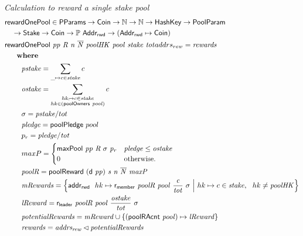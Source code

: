 \begin{figure}[htb]
  \emph{Calculation to reward a single stake pool}
  \begin{align*}
    & \mathsf{rewardOnePool} \in \mathsf{PParams} \to \mathsf{Coin} \to \mathbb{N} \to \mathbb{N} \to \mathsf{HashKey} \to \mathsf{PoolParam}\\
      & ~~~\to \mathsf{Stake} \to \mathsf{Coin} \to \mathbb{P}~\mathsf{Addr_{rwd}}
           \to (\mathsf{Addr_{rwd}} \mapsto \mathsf{Coin}) \\
      & \mathsf{rewardOnePool} ~\mathit{pp}~\mathit{R}~\mathit{n}~\mathit{\overline{N}}~\mathit{poolHK}~\mathit{pool}~\mathit{stake}~\mathit{tot}{addrs_{rew}} =
          \mathit{rewards}\\
      & ~~~~ ~ \mathbf{where}~ ~  \\
      & ~~~~~~~\mathit{pstake} = \sum_{\_\mapsto c\in\mathit{stake}} c \\
      & ~~~~~~~\mathit{ostake} = \sum_{\substack{
        hk_\mapsto c\in\mathit{stake}\\
        hk\in(\mathsf{poolOwners}~\mathit{pool})\\
        }} c \\
      & ~~~~~~~\sigma = \mathit{pstake} / tot \\
      & ~~~~~~~\mathit{pledge} = \mathsf{poolPledge}~pool \\
      & ~~~~~~~p_{r} = \mathit{pledge} / \mathit{tot} \\
      & ~~~~~~~maxP =
      \begin{cases}
        \mathsf{maxPool}~\mathit{pp}~\mathit{R}~\sigma~\mathit{p_r}&
        \mathit{pledge} \leq \mathit{ostake}\\
        0 & \text{otherwise.}
      \end{cases} \\
      & ~~~~~~~\mathit{poolR} = \mathsf{poolReward}~\mathit{(\mathsf{d}~pp)}~\mathit{s}~\mathit{n}~\mathit{\overline{N}}~\mathit{maxP} \\
      & ~~~~~~~\mathit{mRewards} = \left\{
                                  \mathsf{addr_{rwd}}~ \mathit{~}hk\mapsto\mathsf{r_{member}}~ \mathit{poolR}~ \mathit{pool}~ \mathit{\frac{c}{tot}}~ {\sigma}
                                  ~\Big\vert~
                                  hk\mapsto c\in\mathit{stake},~~hk \neq\mathit{poolHK}
                               \right\}\\
      & ~~~~~~~\mathit{lReward} = \mathsf{r_{leader}}~ \mathit{poolR}~ \mathit{pool}~ \mathit{\frac{\mathit{ostake}}{tot}}~ {\sigma} \\
      & ~~~~~~~\mathit{potentialRewards} =
                 \mathit{mReward} \cup
                 \{(\mathsf{poolRAcnt}~\mathit{pool})\mapsto\mathit{lReward}\} \\
      & ~~~~~~~\mathit{rewards} = \mathit{addrs_{rew}}\lhd{\ensuremath{\mathit{potentialRewards}}} \\
  \end{align*}


\end{figure}

